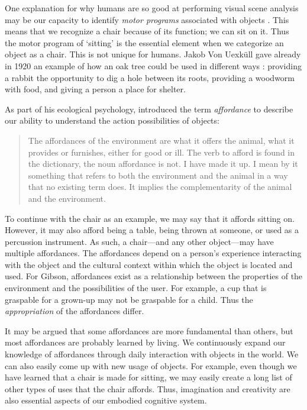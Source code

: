 One explanation for why humans are so good at performing visual scene analysis may be our capacity to identify \emph{motor programs} associated with objects \citep{rosch_basic_1976}. This means that we recognize a chair because of its function; we can sit on it. Thus the motor program of `sitting' is the essential element when we categorize an object as a chair. This is not unique for humans. Jakob Von Uexküll gave already in 1920 an example of how an oak tree could be used in different ways \citep{de_haan_phenomenology_2013}: providing a rabbit the opportunity to dig a hole between its roots, providing a woodworm with food, and giving a person a place for shelter.

As part of his ecological psychology, \citet[p.127]{gibson_theory_1977} introduced the term \emph{affordance} to describe our ability to understand the action possibilities of objects:

\begin{quote}
The affordances of the environment are what it offers the animal, what it provides or furnishes, either for good or ill. The verb to afford is found in the dictionary, the noun affordance is not. I have made it up. I mean by it something that refers to both the environment and the animal in a way that no existing term does. It implies the complementarity of the animal and the environment.
\end{quote}

To continue with the chair as an example, we may say that it affords sitting on. However, it may also afford being a table, being thrown at someone, or used as a percussion instrument. As such, a chair---and any other object---may have multiple affordances. The affordances depend on a person's experience interacting with the object and the cultural context within which the object is located and used. For Gibson, affordances exist as a relationship between the properties of the environment and the possibilities of the user. For example, a cup that is graspable for a grown-up may not be graspable for a child. Thus the \emph{appropriation} of the affordances differ.

It may be argued that some affordances are more fundamental than others, but most affordances are probably learned by living. We continuously expand our knowledge of affordances through daily interaction with objects in the world. We can also easily come up with new usage of objects. For example, even though we have learned that a chair is made for sitting, we may easily create a long list of other types of uses that the chair affords. Thus, imagination and creativity are also essential aspects of our embodied cognitive system.


